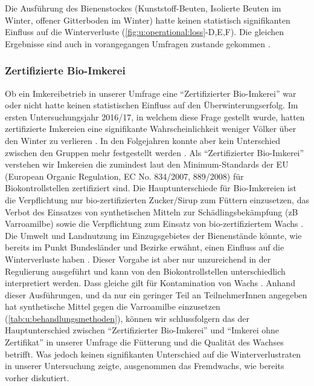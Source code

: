 Die Ausführung des Bienenstockes (Kunststoff-Beuten, Isolierte Beuten im Winter, offener Gitterboden im Winter) hatte keinen statistisch signifikanten Einfluss auf die Winterverluste (\cref{fig:u:operational:loss}-D,E,F). Die gleichen Ergebnisse sind auch in vorangegangen Umfragen zustande gekommen \citep{crailsheim2018, oberreiter2020}.

\subsubsection{Zertifizierte Bio-Imkerei}

Ob ein Imkereibetrieb in unserer Umfrage eine \enquote{Zertifizierter Bio-Imkerei} war oder nicht hatte keinen statistischen Einfluss auf den Überwinterungserfolg. Im ersten Untersuchungsjahr 2016/17, in welchem diese Frage gestellt wurde, hatten zertifizierte Imkereien eine signifikante Wahrscheinlichkeit weniger Völker über den Winter zu verlieren \citep{crailsheim2018}. In den Folgejahren konnte aber kein Unterschied zwischen den Gruppen mehr festgestellt werden \citep{brodschneider2018a, oberreiter2020}.
\newline
Als \enquote{Zertifizierter Bio-Imkerei} verstehen wir Imkereien die zumindest laut den Minimum-Standards der EU (European Organic Regulation, EC No. 834/2007, 889/2008) für Biokontrollstellen zertifiziert sind. Die Hauptunterschiede für Bio-Imkereien ist die Verpflichtung nur bio-zertifizierten Zucker/Sirup zum Füttern einzusetzen, das Verbot des Einsatzes von synthetischen Mitteln zur Schädlingsbekämpfung (zB Varroamilbe) sowie die Verpflichtung zum Einsatz von bio-zertifiziertem Wachs \citep{thrasyvoulou2015}. Die Umwelt und Landnutzung im Einzugsgebietes der Bienenstände könnte, wie bereits im Punkt Bundesländer und Bezirke erwähnt, einen Einfluss auf die Winterverluste haben \citep{kuchling2018}. Dieser Vorgabe ist aber nur unzureichend in der Regulierung ausgeführt und kann von den Biokontrollstellen unterschiedlich interpretiert werden. Dass gleiche gilt für Kontamination von Wachs \citep{thrasyvoulou2015}.
\newline
Anhand dieser Ausführungen, und da nur ein geringer Teil an TeilnehmerInnen angegeben hat synthetische Mittel gegen die Varroamilbe einzusetzen (\cref{tab:u:behandlungsmethoden}), können wir schlussfolgern das der Hauptunterschied zwischen \enquote{Zertifizierter Bio-Imkerei} und \enquote{Imkerei ohne Zertifikat} in unserer Umfrage die Fütterung und die Qualität des Wachses betrifft. Was jedoch keinen signifikanten Unterschied auf die Winterverlustraten in unserer Untersuchung zeigte, ausgenommen das Fremdwachs, wie bereits vorher diskutiert.

